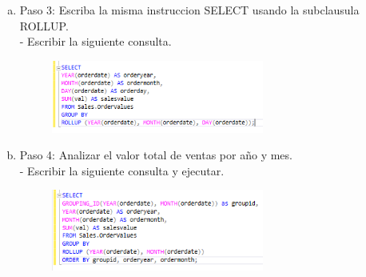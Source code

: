 \begin{enumerate}[1.]
\begin{enumerate}[a)]
\begin{figure}[H]
\begin{center}
		\end{center}
		\end{figure}
	\item Paso 3: Escriba la misma instruccion SELECT usando la subclausula ROLLUP.\\
		-  Escribir la siguiente consulta. 
		\begin{figure}[H]
		\begin{center}
		\includegraphics[width=7cm]{./Imagenes/c9}
		\end{center}
		\end{figure}
	\item Paso 4: Analizar el valor total de ventas por año y mes.\\
		-  Escribir la siguiente consulta y ejecutar. 
		\begin{figure}[H]
		\begin{center}
		\includegraphics[width=7cm]{./Imagenes/c10}
		\end{center}
		\end{figure}
	\end{enumerate}
\end{enumerate}



